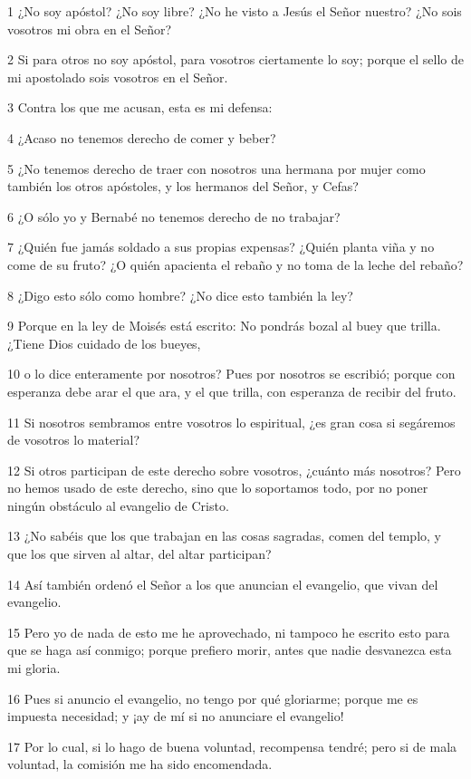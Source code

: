 \par 1 ¿No soy apóstol? ¿No soy libre? ¿No he visto a Jesús el Señor nuestro? ¿No sois vosotros mi obra en el Señor?
\par 2 Si para otros no soy apóstol, para vosotros ciertamente lo soy; porque el sello de mi apostolado sois vosotros en el Señor.
\par 3 Contra los que me acusan, esta es mi defensa:
\par 4 ¿Acaso no tenemos derecho de comer y beber?
\par 5 ¿No tenemos derecho de traer con nosotros una hermana por mujer como también los otros apóstoles, y los hermanos del Señor, y Cefas?
\par 6 ¿O sólo yo y Bernabé no tenemos derecho de no trabajar?
\par 7 ¿Quién fue jamás soldado a sus propias expensas? ¿Quién planta viña y no come de su fruto? ¿O quién apacienta el rebaño y no toma de la leche del rebaño?
\par 8 ¿Digo esto sólo como hombre? ¿No dice esto también la ley?
\par 9 Porque en la ley de Moisés está escrito: No pondrás bozal al buey que trilla.¿Tiene Dios cuidado de los bueyes,
\par 10 o lo dice enteramente por nosotros? Pues por nosotros se escribió; porque con esperanza debe arar el que ara, y el que trilla, con esperanza de recibir del fruto.
\par 11 Si nosotros sembramos entre vosotros lo espiritual, ¿es gran cosa si segáremos de vosotros lo material?
\par 12 Si otros participan de este derecho sobre vosotros, ¿cuánto más nosotros? Pero no hemos usado de este derecho, sino que lo soportamos todo, por no poner ningún obstáculo al evangelio de Cristo.
\par 13 ¿No sabéis que los que trabajan en las cosas sagradas, comen del templo, y que los que sirven al altar, del altar participan?
\par 14 Así también ordenó el Señor a los que anuncian el evangelio, que vivan del evangelio.
\par 15 Pero yo de nada de esto me he aprovechado, ni tampoco he escrito esto para que se haga así conmigo; porque prefiero morir, antes que nadie desvanezca esta mi gloria.
\par 16 Pues si anuncio el evangelio, no tengo por qué gloriarme; porque me es impuesta necesidad; y ¡ay de mí si no anunciare el evangelio!
\par 17 Por lo cual, si lo hago de buena voluntad, recompensa tendré; pero si de mala voluntad, la comisión me ha sido encomendada.
